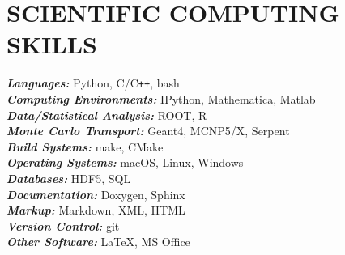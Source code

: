 \section{\small{SCIENTIFIC COMPUTING \\ SKILLS}}

{\sl\bf Languages:} \hfill Python, C/C\verb!++!, bash\\
{\sl\bf Computing Environments:} \hfill IPython, Mathematica, Matlab \\
{\sl\bf Data/Statistical Analysis:} \hfill ROOT, R\\ 
{\sl\bf Monte Carlo Transport:} \hfill Geant4, MCNP5/X, Serpent\\
{\sl\bf Build Systems:} \hfill make, CMake\\
{\sl\bf Operating Systems:} \hfill macOS, Linux, Windows\\
{\sl\bf Databases:} \hfill HDF5, SQL\\
{\sl\bf Documentation:} \hfill Doxygen, Sphinx\\
{\sl\bf Markup:} \hfill Markdown, XML, HTML\\
{\sl\bf Version Control:} \hfill git\\
{\sl\bf Other Software:} \hfill \LaTeX, MS Office

%